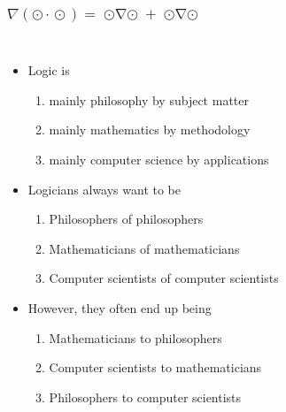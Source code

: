 \documentclass[UTF8,aspectratio=43,11pt,colorlinks,compress,openany]{beamer}%
\begin{document}
\begin{frame}\frametitle{$\nabla(\odot\!\cdot\!\odot)=\operatorname{\odot\nabla\odot}+\operatorname{\odot\nabla\odot}$}
\begin{columns}
	\Large{
		\begin{itemize}
			\item Logic is
			\begin{enumerate}
				\item mainly philosophy by subject matter
				\item mainly mathematics by methodology
				\item mainly computer science by applications
			\end{enumerate}
			\item Logicians always want to be
			\begin{enumerate}
				\item Philosophers of philosophers
				\item Mathematicians of mathematicians
				\item Computer scientists of computer scientists
			\end{enumerate}
			\item However, they often end up being
			\begin{enumerate}
				\item Mathematicians to philosophers
				\item Computer scientists to mathematicians
				\item Philosophers to computer scientists
			\end{enumerate}
	\end{itemize}}
\end{columns}
\end{frame}
\end{document}
